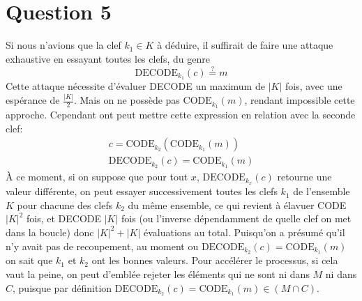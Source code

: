 \documentclass{article}
\begin{document}
\pagebreak
\section{Question 5}
Si nous n'avions que la clef $k_1 \in K$ à déduire, il suffirait de faire une attaque exhaustive en essayant toutes les clefs, du genre $$ \text{DECODE}_{k_1}(c)\stackrel{?}{=}m $$
Cette attaque nécessite d'évaluer DECODE un maximum de $|K|$ fois, avec une espérance de $\frac{|K|}{2}$. Mais on ne possède pas $\text{CODE}_{k_1}(m)$, rendant impossible cette approche. Cependant ont peut mettre cette expression en relation avec la seconde clef:
\begin{align*}
  c = \text{CODE}_{k_2}(\text{CODE}_{k_1}(m))\\
  \text{DECODE}_{k_2}(c) = \text{CODE}_{k_1}(m)
\end{align*}
À ce moment, si on suppose que pour tout $x$, $\text{DECODE}_{k_x}(c)$ retourne une valeur différente, on peut essayer successivement toutes les clefs $k_1$ de l'ensemble $K$ pour chacune des clefs $k_2$ du même ensemble, ce qui revient à élavuer CODE $|K|^2$ fois, et DECODE $|K|$ fois (ou l'inverse dépendamment de quelle clef on met dans la boucle) donc $|K|^2+|K|$ évaluations au total. Puisqu'on a présumé qu'il n'y avait pas de recoupement, au moment ou $\text{DECODE}_{k_2}(c) = \text{CODE}_{k_1}(m)$ on sait que $k_1$ et $k_2$ ont les bonnes valeurs. Pour accélérer le processus, si cela vaut la peine, on peut d'emblée rejeter les éléments qui ne sont ni dans $M$ ni dans $C$, puisque par définition $\text{DECODE}_{k_2}(c) = \text{CODE}_{k_1}(m) \in (M \cap C)$.
\end{document}
